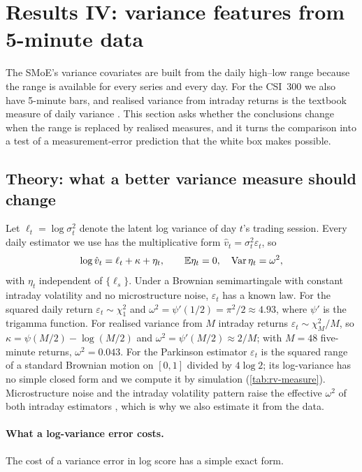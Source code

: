 \section{Results IV: variance features from 5-minute data}\label{sec:rv}

The SMoE's variance covariates are built from the daily high--low range because the range is
available for every series and every day. For the CSI~300 we also have 5-minute bars, and realised
variance from intraday returns is the textbook measure of daily variance
\citep{andersen2003modeling}. This section asks whether the conclusions change when the range is
replaced by realised measures, and it turns the comparison into a test of a measurement-error
prediction that the white box makes possible.

\subsection{Theory: what a better variance measure should change}

Let $\ell_t=\log\sigma^2_t$ denote the latent log variance of day $t$'s trading session. Every daily
estimator we use has the multiplicative form $\hat v_t=\sigma^2_t\varepsilon_t$, so
\begin{equation}\label{eq:logmeas}
  \log\hat v_t=\ell_t+\kappa+\eta_t,\qquad \mathbb{E}\eta_t=0,\quad \operatorname{Var}\eta_t=\omega^2,
\end{equation}
with $\eta_t$ independent of $\{\ell_s\}$. Under a Brownian semimartingale with constant intraday
volatility and no microstructure noise, $\varepsilon_t$ has a known law. For the squared daily
return $\varepsilon_t\sim\chi^2_1$ and $\omega^2=\psi'(1/2)=\pi^2/2\approx4.93$, where $\psi'$ is the
trigamma function. For realised variance from $M$ intraday returns
$\varepsilon_t\sim\chi^2_M/M$, so $\kappa=\psi(M/2)-\log(M/2)$ and $\omega^2=\psi'(M/2)\approx2/M$;
with $M=48$ five-minute returns, $\omega^2=0.043$. For the Parkinson estimator $\varepsilon_t$ is the
squared range of a standard Brownian motion on $[0,1]$ divided by $4\log2$; its log-variance has no
simple closed form and we compute it by simulation (\cref{tab:rv-measure}). Microstructure noise and
the intraday volatility pattern raise the effective $\omega^2$ of both intraday estimators
\citep{hansen2006realized}, which is why we also estimate it from the data.

\paragraph{What a log-variance error costs.}
The cost of a variance error in log score has a simple exact form.


